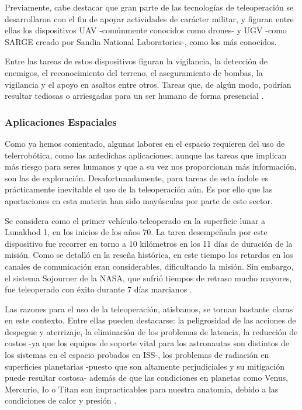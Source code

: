 Previamente, cabe destacar que gran parte de las tecnologías de teleoperación se desarrollaron con el fin de apoyar actividades de carácter militar, y figuran entre ellas los dispositivos UAV -comúnmente conocidos como drones- y UGV -como SARGE creado por Sandia National Laboratories-, como los más conocidos. 

Entre las tareas de estos dispositivos figuran la vigilancia, la detección de enemigos, el reconocimiento del terreno, el aseguramiento de bombas, la vigilancia y el apoyo en asaltos entre otros. Tareas que, de algún modo, podrían resultar tediosas o arriesgadas para un ser humano de forma presencial \cite{9}.

\subsubsection{Aplicaciones Espaciales}
Como ya hemos comentado, algunas labores en el espacio requieren del uso de telerrobótica, como las antedichas aplicaciones; aunque las tareas que implican más riesgo para seres humanos y que a su vez nos proporcionan más información, son las de exploración. Desafortunadamente, para tareas de esta índole es prácticamente inevitable el uso de la teleoperación aún. Es por ello que las aportaciones en esta materia han sido mayúsculas por parte de este sector.

Se considera como el primer vehículo teleoperado en la superficie lunar a Lunakhod 1, en los inicios de los años 70. La tarea desempeñada por este dispositivo fue recorrer en torno a 10 kilómetros en los 11 días de duración de la misión. Como se detalló en la reseña histórica, en este tiempo los retardos en los canales de comunicación eran considerables, dificultando la misión. Sin embargo, el sistema Sojourner de la NASA, que sufrió  tiempos de retraso mucho mayores, fue teleoperado con éxito durante 7 días marcianos \cite{10}.

Las razones para el uso de la teleoperación, atisbamos, se tornan bastante claras en este contexto. Entre ellas pueden destacarse: la peligrosidad de las acciones de despegue y aterrizaje, la eliminación de los problemas de latencia, la reducción de costos -ya que los equipos de soporte vital para los astronautas son distintos de los sistemas en el espacio probados en ISS-, los problemas de radiación en superficies planetarias -puesto que son altamente perjudiciales y su mitigación puede resultar costosa- además de que las condiciones en planetas como Venus, Mercurio, Io o Titan son impracticables para nuestra anatomía, debido a las condiciones de calor y presión \cite{11}.

